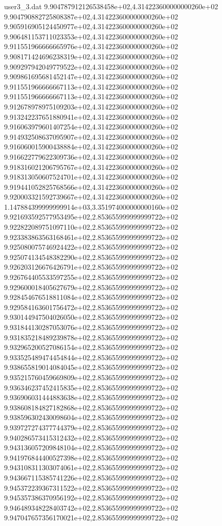 \begin{filecontents}{user3_3.dat}
9.904787912126538458e+02,4.314223600000000260e+02
9.904790882725808387e+02,4.314223600000000260e+02
9.905916905124450977e+02,4.314223600000000260e+02
9.906481153711023353e+02,4.314223600000000260e+02
9.911551966666665976e+02,4.314223600000000260e+02
9.908171424696238319e+02,4.314223600000000260e+02
9.909297942049779522e+02,4.314223600000000260e+02
9.909861695681452147e+02,4.314223600000000260e+02
9.911551966666667113e+02,4.314223600000000260e+02
9.911551966666667113e+02,4.314223600000000260e+02
9.912678978975109203e+02,4.314223600000000260e+02
9.913242237651880941e+02,4.314223600000000260e+02
9.916063979601407254e+02,4.314223600000000260e+02
9.914932508637095907e+02,4.314223600000000260e+02
9.916060015900438884e+02,4.314223600000000260e+02
9.916622779622309736e+02,4.314223600000000260e+02
9.918316021206795767e+02,4.314223600000000260e+02
9.918313050607524701e+02,4.314223600000000260e+02
9.919441052825768566e+02,4.314223600000000260e+02
9.920003321592739667e+02,4.314223600000000260e+02
1.147884399999999914e+03,3.351974000000000160e+02
9.921693592577953495e+02,2.853655999999999722e+02
9.922822089751097110e+02,2.853655999999999722e+02
9.923383863563168461e+02,2.853655999999999722e+02
9.925080075746924422e+02,2.853655999999999722e+02
9.925074134548382290e+02,2.853655999999999722e+02
9.926203126676426791e+02,2.853655999999999722e+02
9.926764405533597255e+02,2.853655999999999722e+02
9.929600018405627679e+02,2.853655999999999722e+02
9.928454676518811084e+02,2.853655999999999722e+02
9.929584163601756472e+02,2.853655999999999722e+02
9.930144947504026050e+02,2.853655999999999722e+02
9.931844130287053076e+02,2.853655999999999722e+02
9.931835218489239878e+02,2.853655999999999722e+02
9.932965200527086154e+02,2.853655999999999722e+02
9.933525489474454844e+02,2.853655999999999722e+02
9.938655819014084045e+02,2.853655999999999722e+02
9.935215760459669809e+02,2.853655999999999722e+02
9.936346237452415835e+02,2.853655999999999722e+02
9.936906031444883638e+02,2.853655999999999722e+02
9.938608184827182868e+02,2.853655999999999722e+02
9.938596302430098604e+02,2.853655999999999722e+02
9.939727274377744379e+02,2.853655999999999722e+02
9.940286573415312432e+02,2.853655999999999722e+02
9.943136057209848104e+02,2.853655999999999722e+02
9.941976844400527398e+02,2.853655999999999722e+02
9.943108311303074061e+02,2.853655999999999722e+02
9.943667115385741226e+02,2.853655999999999722e+02
9.945372239367311522e+02,2.853655999999999722e+02
9.945357386370956192e+02,2.853655999999999722e+02
9.946489348228403742e+02,2.853655999999999722e+02
9.947047657356170021e+02,2.853655999999999722e+02

\end{filecontents}
